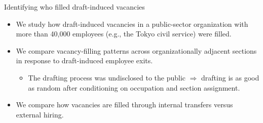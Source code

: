 \begin{frame}{Identifying who filled draft-induced vacancies}
    \begin{itemize}[<+->]
        \item We study how draft-induced vacancies in a public-sector organization with more than 40{,}000 employees (e.g., the Tokyo civil service) were filled.

        \vspace{0.5em}

         \item We compare vacancy-filling patterns across organizationally adjacent sections in response to draft-induced employee exits.
        \begin{itemize}[<+->]
            \item The drafting process was undisclosed to the public $\Rightarrow$ drafting is as good as random after conditioning on occupation and section assignment.
        \end{itemize}

        \item We compare how vacancies are filled through internal transfers versus external hiring.

    \end{itemize}
\end{frame}